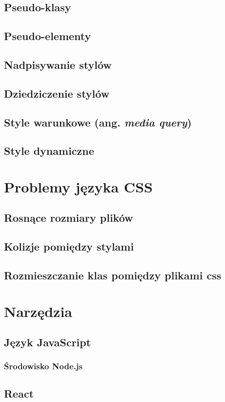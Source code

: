 \documentclass[a4paper,12pt]{book} %
\begin{document}
\section{Pseudo-klasy}
\section{Pseudo-elementy}
\section{Nadpisywanie stylów}
\section{Dziedziczenie stylów}
\section{Style warunkowe (ang. \emph{media query})}
\section{Style dynamiczne}

\chapter{Problemy języka CSS}
\section{Rosnące rozmiary plików}
\section{Kolizje pomiędzy stylami}
\section{Rozmieszczanie klas pomiędzy plikami css}

\chapter{Narzędzia}
\section{Język JavaScript}
\subsection{Środowisko Node.js}
\section{React}
\end{document}

